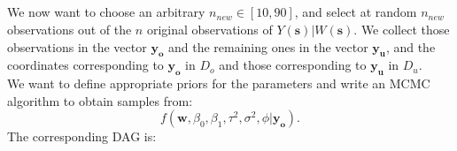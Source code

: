 \documentclass[a4paper,12pt]{article}
\begin{document}
\subsection{}
We now want to choose an arbitrary \(n_{new} \in [10,90]\), and select at random \(n_{new}\) observations out of the \(n\) original observations of \(Y(\mathbf{s})|W(\mathbf{s})\). We collect those observations in the vector \(\mathbf{y_o}\) and the remaining ones in the vector \(\mathbf{y_u}\), and the coordinates corresponding to \(\mathbf{y_o}\) in \(D_o\) and those corresponding to \(\mathbf{y_u}\) in \(D_u\). \\
We want to define appropriate priors for the parameters and write an MCMC algorithm to obtain samples from:
\begin{equation*}
    f(\mathbf{w}, \beta_0, \beta_1, \tau^2, \sigma^2, \phi|\mathbf{y_o}).
\end{equation*}
The corresponding DAG is:
\begin{center}
\end{center}
\end{document}
